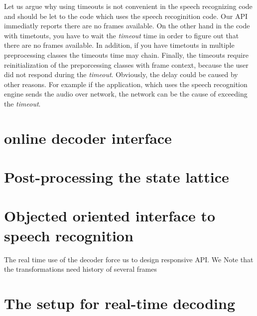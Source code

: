 Let us argue why using timeouts is not convenient in the speech recognizing code
and should be let to the code which uses the speech recoginition code.
Our \ac{API} immediatly reports there are no frames available.
On the other hand in the code with timetouts, you have to wait the {\it timeout}\/ time
in order to figure out that there are no frames available.
In addition, if you have timetouts in multiple preprocessing classes the timeouts time may chain.
Finally, the timeouts require reinitialization of the preporcessing classes with frame context,
because the user did not respond during the {\it timeout}\/. 
Obviously, the delay could be caused by other reasons. For example if the application, 
which uses the speech recognition engine sends the audio over network, the network can be
the cause of exceeding the {\it timeout}\/.

\section{online decoder interface} 
\label{sec:improve}




\section{Post-processing the state lattice}
\label{sec:postprocess}



\section{Objected oriented interface to speech recognition}
\label{sec:ooi}

The real time use of the decoder force us to design responsive \acl{API}.
We  
Note that the transformations need history of several frames



\section{The setup for real-time decoding}

